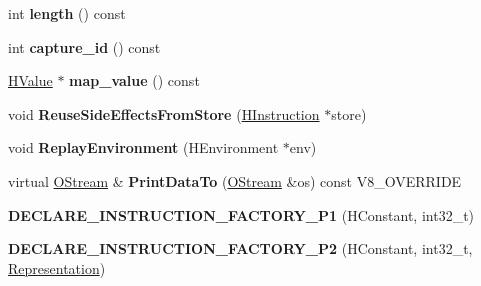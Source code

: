 \begin{DoxyCompactItemize}
\item 
\hypertarget{classv8_1_1internal_1_1_v8___f_i_n_a_l_a60979317d806209562eb02b81421b9fd}{}int {\bfseries length} () const \label{classv8_1_1internal_1_1_v8___f_i_n_a_l_a60979317d806209562eb02b81421b9fd}

\item 
\hypertarget{classv8_1_1internal_1_1_v8___f_i_n_a_l_ad716d1eeb8fa7598ff2d8ac3b42b82b5}{}int {\bfseries capture\+\_\+id} () const \label{classv8_1_1internal_1_1_v8___f_i_n_a_l_ad716d1eeb8fa7598ff2d8ac3b42b82b5}

\item 
\hypertarget{classv8_1_1internal_1_1_v8___f_i_n_a_l_a3bc596d208fce8c9be5bca7602361bce}{}\hyperlink{classv8_1_1internal_1_1_h_value}{H\+Value} $\ast$ {\bfseries map\+\_\+value} () const \label{classv8_1_1internal_1_1_v8___f_i_n_a_l_a3bc596d208fce8c9be5bca7602361bce}

\item 
\hypertarget{classv8_1_1internal_1_1_v8___f_i_n_a_l_ab2339ba53b0de64ccd34fb5ee85bb969}{}void {\bfseries Reuse\+Side\+Effects\+From\+Store} (\hyperlink{classv8_1_1internal_1_1_h_instruction}{H\+Instruction} $\ast$store)\label{classv8_1_1internal_1_1_v8___f_i_n_a_l_ab2339ba53b0de64ccd34fb5ee85bb969}

\item 
\hypertarget{classv8_1_1internal_1_1_v8___f_i_n_a_l_a94f0e462341a57972a6d9275eb3b54c4}{}void {\bfseries Replay\+Environment} (H\+Environment $\ast$env)\label{classv8_1_1internal_1_1_v8___f_i_n_a_l_a94f0e462341a57972a6d9275eb3b54c4}

\item 
\hypertarget{classv8_1_1internal_1_1_v8___f_i_n_a_l_ac450dad970b14246be761ccf5004924b}{}virtual \hyperlink{classv8_1_1internal_1_1_o_stream}{O\+Stream} \& {\bfseries Print\+Data\+To} (\hyperlink{classv8_1_1internal_1_1_o_stream}{O\+Stream} \&os) const V8\+\_\+\+O\+V\+E\+R\+R\+I\+D\+E\label{classv8_1_1internal_1_1_v8___f_i_n_a_l_ac450dad970b14246be761ccf5004924b}

\item 
\hypertarget{classv8_1_1internal_1_1_v8___f_i_n_a_l_a1bbdbc260695c026ec69810a05804984}{}{\bfseries D\+E\+C\+L\+A\+R\+E\+\_\+\+I\+N\+S\+T\+R\+U\+C\+T\+I\+O\+N\+\_\+\+F\+A\+C\+T\+O\+R\+Y\+\_\+\+P1} (H\+Constant, int32\+\_\+t)\label{classv8_1_1internal_1_1_v8___f_i_n_a_l_a1bbdbc260695c026ec69810a05804984}

\item 
\hypertarget{classv8_1_1internal_1_1_v8___f_i_n_a_l_a4880ba04e010507ce65c3fdec6dbbafd}{}{\bfseries D\+E\+C\+L\+A\+R\+E\+\_\+\+I\+N\+S\+T\+R\+U\+C\+T\+I\+O\+N\+\_\+\+F\+A\+C\+T\+O\+R\+Y\+\_\+\+P2} (H\+Constant, int32\+\_\+t, \hyperlink{classv8_1_1internal_1_1_representation}{Representation})\label{classv8_1_1internal_1_1_v8___f_i_n_a_l_a4880ba04e010507ce65c3fdec6dbbafd}


\end{DoxyCompactItemize}
